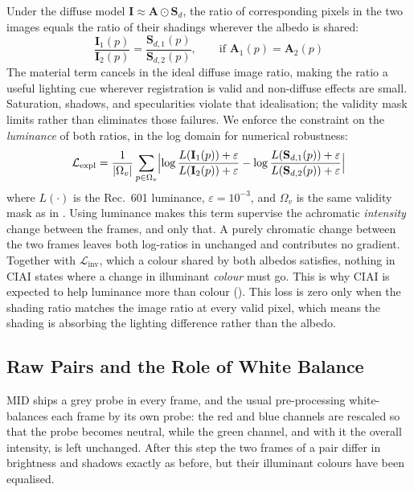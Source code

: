 Under the diffuse model $\mathbf{I} \approx \mathbf{A} \odot \mathbf{S}_d$, the
ratio of corresponding pixels in the two images equals the ratio of their
shadings wherever the albedo is shared:
\begin{equation}
  \frac{\mathbf{I}_1(p)}{\mathbf{I}_2(p)} = \frac{\mathbf{S}_{d,1}(p)}{\mathbf{S}_{d,2}(p)},
  \qquad \text{if } \mathbf{A}_1(p) = \mathbf{A}_2(p)
  \label{eq:explain_ratio}
\end{equation}
The material term cancels in the ideal diffuse image ratio, making the ratio a
useful lighting cue wherever registration is valid and non-diffuse effects are
small. Saturation, shadows, and specularities violate that idealisation; the
validity mask limits rather than eliminates those failures.
We enforce the constraint on the \emph{luminance} of both ratios, in the log
domain for numerical robustness:
\begin{equation}
  \mathcal{L}_{\text{expl}} =
  \frac{1}{|\Omega_v|} \sum_{p \in \Omega_v}
  \Bigl|
    \log\frac{L(\mathbf{I}_1(p)) + \varepsilon}{L(\mathbf{I}_2(p)) + \varepsilon}
  - \log\frac{L(\mathbf{S}_{d,1}(p)) + \varepsilon}{L(\mathbf{S}_{d,2}(p)) + \varepsilon}
  \Bigr|
  \label{eq:lexpl}
\end{equation}
where $L(\cdot)$ is the Rec.~601 luminance, $\varepsilon = 10^{-3}$, and
$\Omega_v$ is the same validity mask as in .
Using luminance makes this term supervise the achromatic \emph{intensity} change
between the frames, and only that. A purely chromatic change between the two frames
leaves both log-ratios in  unchanged and contributes no gradient. Together
with $\mathcal{L}_{\text{inv}}$, which a colour shared by both albedos satisfies, nothing in
CIAI states where a change in illuminant \emph{colour} must go. This is why CIAI is
expected to help luminance more than colour ().
This loss is zero only when the shading ratio matches the image ratio at every
valid pixel, which means the shading is absorbing the lighting difference rather
than the albedo.

\subsection{Raw Pairs and the Role of White Balance}
\label{sec:raw_pairs}

MID ships a grey probe in every frame, and the usual pre-processing white-balances each
frame by its own probe: the red and blue channels are rescaled so that the probe becomes
neutral, while the green channel, and with it the overall intensity, is left unchanged.
After this step the two frames of a pair differ in brightness and shadows exactly as
before, but their illuminant colours have been equalised.

